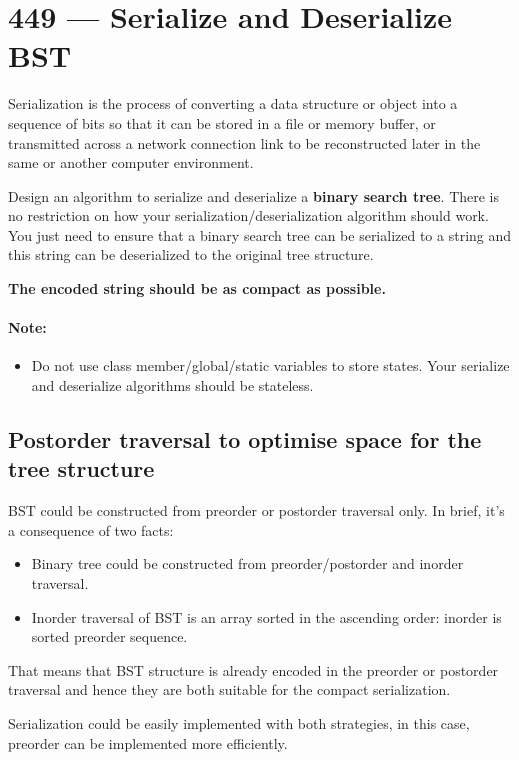 \section{449 --- Serialize and Deserialize BST}
Serialization is the process of converting a data structure or object into a sequence of bits so that it can be stored in a file or memory buffer, or transmitted across a network connection link to be reconstructed later in the same or another computer environment.

Design an algorithm to serialize and deserialize a \textbf{binary search tree}. There is no restriction on how your serialization/deserialization algorithm should work. You just need to ensure that a binary search tree can be serialized to a string and this string can be deserialized to the original tree structure.

\textbf{The encoded string should be as compact as possible.}

\paragraph{Note:} 
\begin{itemize}
\item Do not use class member/global/static variables to store states. Your serialize and deserialize algorithms should be stateless.
\end{itemize}

\subsection{Postorder traversal to optimise space for the tree structure}
BST could be constructed from preorder or postorder traversal only. In brief, it's a consequence of two facts:

\begin{itemize}
\item Binary tree could be constructed from preorder/postorder and inorder traversal.
\item Inorder traversal of BST is an array sorted in the ascending order: inorder is sorted preorder sequence.
\end{itemize}
That means that BST structure is already encoded in the preorder or postorder traversal and hence they are both suitable for the compact serialization.

Serialization could be easily implemented with both strategies, in this case, preorder can be implemented more efficiently.

